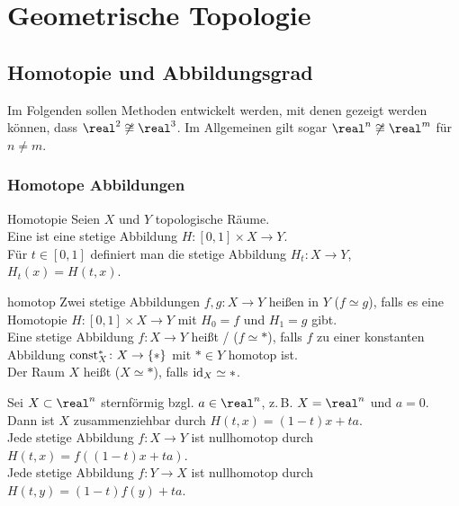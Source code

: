\chapter{%
    Geometrische Topologie%
}

\section{%
    Homotopie und Abbildungsgrad%
}

\begin{Bem}
    Im Folgenden sollen Methoden entwickelt werden, mit denen gezeigt werden
    können, dass $\real^2 \not\cong \real^3$.
    Im Allgemeinen gilt sogar $\real^n \not\cong \real^m$ für $n \not= m$.
\end{Bem}

\subsection{%
    Homotope Abbildungen%
}

\begin{Def}{Homotopie}
    Seien $X$ und $Y$ topologische Räume. \\
    Eine  ist eine stetige Abbildung
    $H\colon [0, 1] \times X \rightarrow Y$. \\
    Für $t \in [0, 1]$ definiert man die stetige Abbildung
    $H_t\colon X \rightarrow Y$, $H_t(x) = H(t, x)$.
\end{Def}

\begin{Def}{homotop}
    Zwei stetige Abbildungen $f, g\colon X \rightarrow Y$ heißen
     in $Y$ ($f \simeq g$), falls es eine Homotopie
    $H\colon [0, 1] \times X \rightarrow Y$
    mit $H_0 = f$ und $H_1 = g$ gibt. \\
    Eine stetige Abbildung $f\colon X \rightarrow Y$ heißt
    / ($f \simeq \ast$),
    falls $f$ zu einer konstanten Abbildung
    $\operatorname{const}_X^\ast\colon X \rightarrow \{\ast\}$
    mit $\ast \in Y$ homotop ist. \\
    Der Raum $X$ heißt  ($X \simeq \ast$),
    falls $\operatorname{id}_X \simeq \ast$.
\end{Def}

\begin{Bsp}
    Sei $X \subset \real^n$ sternförmig bzgl. $a \in \real^n$,
    z.\,B. $X = \real^n$ und $a = 0$. \\
    Dann ist $X$ zusammenziehbar durch $H(t, x) = (1 - t)x + ta$. \\
    Jede stetige Abbildung $f\colon X \rightarrow Y$ ist nullhomotop
    durch $H(t, x) = f((1 - t)x + ta)$. \\
    Jede stetige Abbildung $f\colon Y \rightarrow X$ ist nullhomotop
    durch $H(t, y) = (1 - t)f(y) + ta$.
\end{Bsp}

